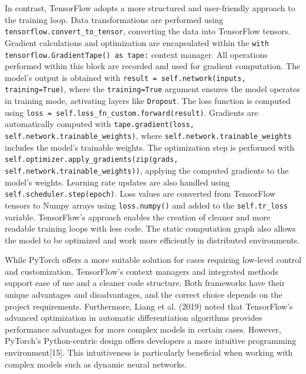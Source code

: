\documentclass[conference]{IEEEtran}
\renewcommand\tablename{TABLO}
\begin{document}
In contrast, TensorFlow adopts a more structured and user-friendly approach to the training loop. Data transformations are performed using \texttt{tensorflow.convert\_to\_tensor}, converting the data into TensorFlow tensors. Gradient calculations and optimization are encapsulated within the \texttt{with tensorflow.GradientTape() as tape:} context manager. All operations performed within this block are recorded and used for gradient computation. The model’s output is obtained with \texttt{result = self.network(inputs, training=True)}, where the \texttt{training=True} argument ensures the model operates in training mode, activating layers like \texttt{Dropout}. The loss function is computed using \texttt{loss = self.loss\_fn\_custom.forward(result)}. Gradients are automatically computed with \texttt{tape.gradient(loss, self.network.trainable\_weights)}, where \texttt{self.network.trainable\_weights} includes the model’s trainable weights. The optimization step is performed with \texttt{self.optimizer.apply\_gradients(zip(grads, self.network.trainable\_weights))}, applying the computed gradients to the model’s weights. Learning rate updates are also handled using \texttt{self.scheduler.step(epoch)}. Loss values are converted from TensorFlow tensors to Numpy arrays using \texttt{loss.numpy()} and added to the \texttt{self.tr\_loss} variable. TensorFlow’s approach enables the creation of cleaner and more readable training loops with less code. The static computation graph also allows the model to be optimized and work more efficiently in distributed environments.

While PyTorch offers a more suitable solution for cases requiring low-level control and customization, TensorFlow’s context managers and integrated methods support ease of use and a cleaner code structure. Both frameworks have their unique advantages and disadvantages, and the correct choice depends on the project requirements. Furthermore, Liang et al. (2019) noted that TensorFlow’s advanced optimization in automatic differentiation algorithms provides performance advantages for more complex models in certain cases. However, PyTorch’s Python-centric design offers developers a more intuitive programming environment[15]. This intuitiveness is particularly beneficial when working with complex models such as dynamic neural networks.


\renewcommand{\tablename}{Table}  %
\end{document}
